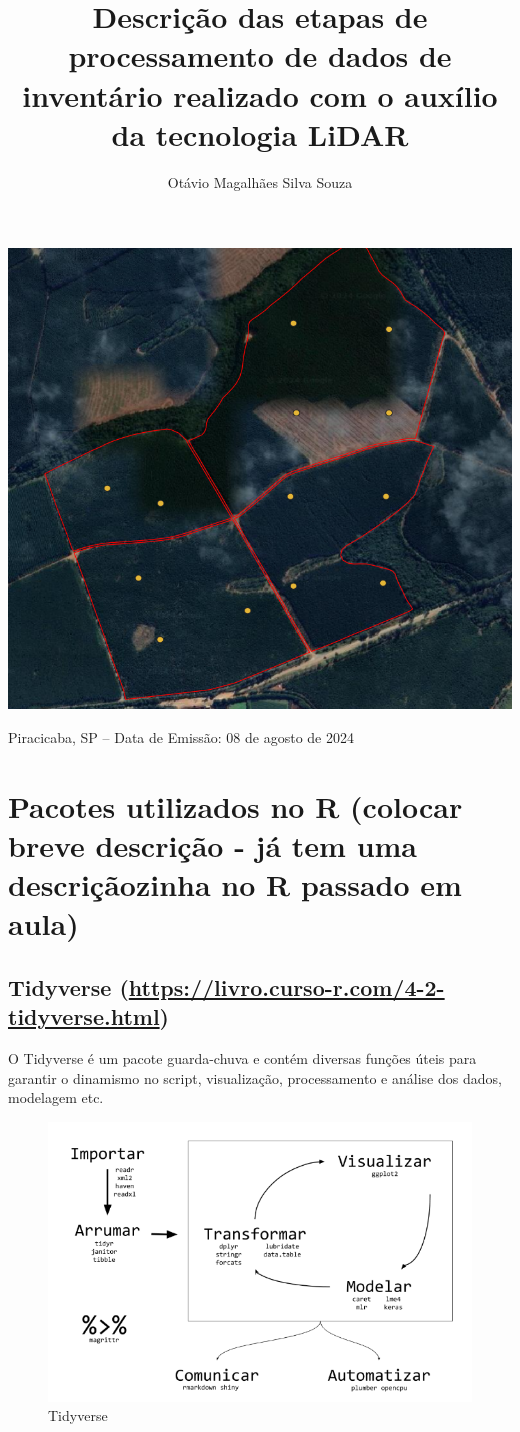 \documentclass[
]{article}
\title{Descrição das etapas de processamento de dados de inventário
realizado com o auxílio da tecnologia LiDAR}
\author{Otávio Magalhães Silva Souza}
\date{}
\begin{document}
\maketitle

\begin{center}\includegraphics[width=0.4\linewidth]{IMAGES/CAPA} \end{center}

\centerline {Piracicaba, SP – Data de Emissão: 08 de agosto de 2024}
\newpage

\tableofcontents

\newpage

\section{Pacotes utilizados no R (colocar breve descrição - já tem uma
descriçãozinha no R passado em
aula)}\label{pacotes-utilizados-no-r-colocar-breve-descriuxe7uxe3o---juxe1-tem-uma-descriuxe7uxe3ozinha-no-r-passado-em-aula}

\subsection{\texorpdfstring{Tidyverse
(\url{https://livro.curso-r.com/4-2-tidyverse.html})}{Tidyverse (https://livro.curso-r.com/4-2-tidyverse.html)}}\label{tidyverse-httpslivro.curso-r.com4-2-tidyverse.html}

O Tidyverse é um pacote guarda-chuva e contém diversas funções úteis
para garantir o dinamismo no script, visualização, processamento e
análise dos dados, modelagem etc.

\begin{figure}

{\centering \includegraphics[width=0.6\linewidth]{IMAGES/tidyverse} 

}

\caption{Tidyverse}\label{fig:unnamed-chunk-2}
\end{figure}
\end{document}
